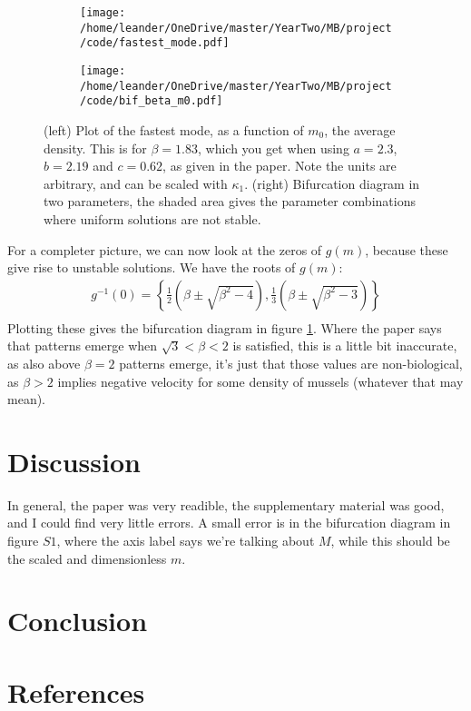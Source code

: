 \documentclass[a4paper]{jpconf}
\begin{document}
\begin{figure}[h!]
    \centering
    \begin{subfigure}[t]{0.5\textwidth}\centering
        \texttt{[image: /home/leander/OneDrive/master/YearTwo/MB/project/code/fastest\_mode.pdf]}
    \end{subfigure}\hfill
    \begin{subfigure}[t]{0.5\textwidth}\centering
        \texttt{[image: /home/leander/OneDrive/master/YearTwo/MB/project/code/bif\_beta\_m0.pdf]}
        
    \end{subfigure}
    \caption{(left) Plot of the fastest mode, as a function of $m_0$, the average density. This is for $\beta=1.83$, which you get when using $a=  2.3$, $b = 2.19$ and $c = 0.62$, as given in the paper. Note the units are arbitrary, and can be scaled with $\kappa_1$. (right) Bifurcation diagram in two parameters, the shaded area gives the parameter combinations where uniform solutions are not stable.}\label{bif_beta_m0}
\end{figure}

For a completer picture, we can now look at the zeros of $g(m)$, because these give rise to unstable solutions. We have the roots of $g(m)$:
\[
\begin{aligned}
g^{-1}(0) =  \left\{\frac{1}{2}\left(\beta \pm \sqrt{\beta^2 - 4}\right) ,\frac{1}{3}\left(\beta \pm \sqrt{\beta^2 - 3}\right)\right\} \\
\end{aligned}
\]
Plotting these gives the bifurcation diagram in figure \ref{bif_beta_m0}.
Where the paper says that patterns emerge when $\sqrt 3<\beta<2$ is satisfied, this is a little bit inaccurate, as also above $\beta=2$ patterns emerge, it's just that those values are non-biological, as $\beta>2$ implies negative velocity for some density of mussels (whatever that may mean). 

\section{Discussion}
In general, the paper was very readible, the supplementary material was good, and I could find very little errors. A small error is in the bifurcation diagram in figure $S1$, where the axis label says we're talking about $M$, while this should be the scaled and dimensionless $m$. \\


\section{Conclusion}

\section*{References}


\end{document}
